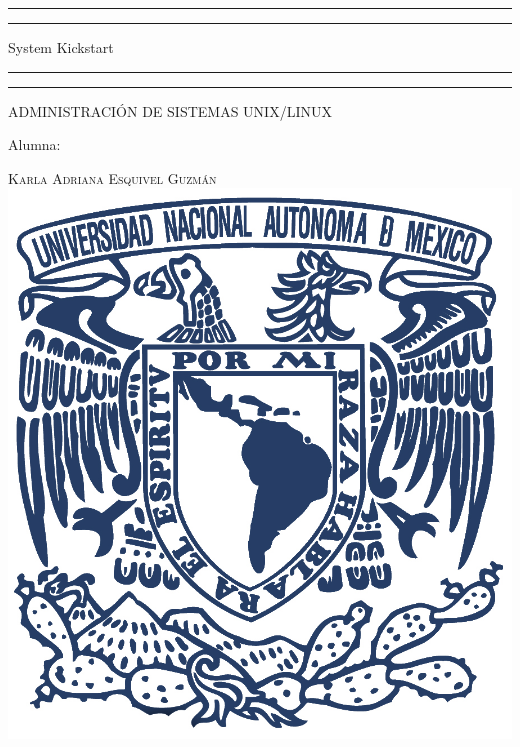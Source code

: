 \documentclass[a4paper, 11pt, oneside]{article}
\begin{document}
 

\begin{titlepage} 

	\centering 
	
	\scshape 
	
	\vspace*{\baselineskip} 
	
	
	
	\rule{\textwidth}{1.6pt}\vspace*{-\baselineskip}\vspace*{2pt} 
	\rule{\textwidth}{0.4pt} 
	
	\vspace{0.75\baselineskip} 
	
	{\LARGE System Kickstart}	
	\vspace{0.75\baselineskip} 
	
	\rule{\textwidth}{0.4pt}\vspace*{-\baselineskip}\vspace{3.2pt}
	\rule{\textwidth}{1.6pt} 
	
	\vspace{2\baselineskip} 
	

	ADMINISTRACIÓN DE SISTEMAS UNIX/LINUX
	
	\vspace*{3\baselineskip} 
	
	
	
	Alumna:
	
	\vspace{0.5\baselineskip} 
	
	{\scshape\Large Karla Adriana Esquivel Guzmán \\} 
	\vspace{0.5\baselineskip} 
	\vfill
	\includegraphics{unam.jpg}
	

\end{titlepage}
\end{document}
